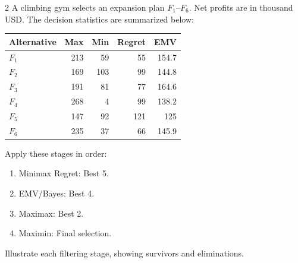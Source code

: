 \begin{multicols}{2}
\raggedcolumns
{}
A climbing gym selects an expansion plan $F_1$--$F_6$. Net profits are in thousand USD. The decision statistics are summarized below:
\vspace{-3mm}
\begin{center}\small\setlength{\tabcolsep}{4pt}
	\begin{tabular}{lrrrr}\toprule
		Alternative & Max & Min & Regret & EMV\\ \midrule
		$F_1$ & 213 & 59 & 55 & 154.7\\
		$F_2$ & 169 & 103 & 99 & 144.8\\
		$F_3$ & 191 & 81 & 77 & 164.6\\
		$F_4$ & 268 & 4 & 99 & 138.2\\
		$F_5$ & 147 & 92 & 121 & 125\\
		$F_6$ & 235 & 37 & 66 & 145.9\\
		\bottomrule
	\end{tabular}
\end{center}
\vspace{-3mm}
Apply these stages in order:
\begin{enumerate}[leftmargin=*]
	\item Minimax Regret: Best 5.
	\item EMV/Bayes: Best 4.
	\item Maximax: Best 2.
	\item Maximin: Final selection.
\end{enumerate}
Illustrate each filtering stage, showing survivors and eliminations.



\end{multicols}
